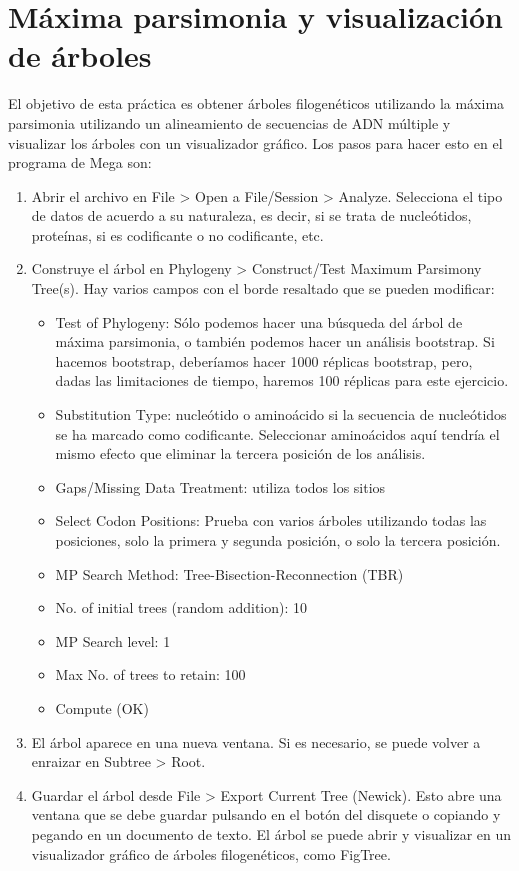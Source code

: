 \section{Máxima parsimonia y visualización de árboles}
El objetivo de esta práctica es obtener árboles filogenéticos utilizando la máxima parsimonia utilizando un alineamiento de secuencias de ADN múltiple y visualizar los árboles con un visualizador gráfico. Los pasos para hacer esto en el programa de Mega son:
\begin{enumerate}
\item Abrir el archivo en File > Open a File/Session > Analyze. Selecciona el tipo de datos de acuerdo a su naturaleza, es decir, si se trata de nucleótidos, proteínas, si es codificante o no codificante, etc.
\item Construye el árbol en Phylogeny > Construct/Test Maximum Parsimony Tree(s). Hay varios campos con el borde resaltado que se pueden modificar:
\begin{itemize}
\item Test of Phylogeny: Sólo podemos hacer una búsqueda del árbol de máxima parsimonia, o también podemos hacer un análisis bootstrap. Si hacemos bootstrap, deberíamos hacer 1000 réplicas bootstrap, pero, dadas las limitaciones de tiempo, haremos 100 réplicas para este ejercicio.
\item Substitution Type: nucleótido o aminoácido si la secuencia de nucleótidos se ha marcado como codificante. Seleccionar aminoácidos aquí tendría el mismo efecto que eliminar la tercera posición de los análisis. 
\item Gaps/Missing Data Treatment: utiliza todos los sitios
\item Select Codon Positions: Prueba con varios árboles utilizando todas las posiciones, solo la primera y segunda posición, o solo la tercera posición.
\item MP Search Method: Tree-Bisection-Reconnection (TBR)
\item No. of initial trees (random addition): 10
\item MP Search level: 1
\item Max No. of trees to retain: 100
\item Compute (OK)
\end{itemize}
\item El árbol aparece en una nueva ventana. Si es necesario, se puede volver a enraizar en Subtree > Root.
\item Guardar el árbol desde File > Export Current Tree (Newick). Esto abre una ventana que se debe guardar pulsando en el botón del disquete o copiando y pegando en un documento de texto. El árbol se puede abrir y visualizar en un visualizador gráfico de árboles filogenéticos, como FigTree.
\end{enumerate}

